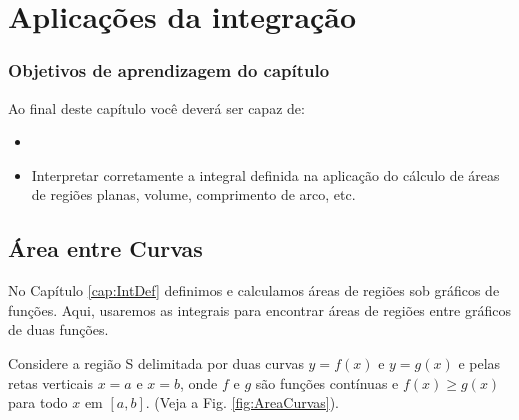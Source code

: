 \cleardoublepage\documentclass[../main.tex]{subfiles}
\begin{document}
\renewcommand\contentsname{Conteúdos do Capítulo}
\chapter{Aplicações da integração}\label{cap:apl_integracao}
\minitoc
\subsection*{Objetivos de aprendizagem do capítulo}
Ao final deste capítulo você deverá ser capaz de:
\begin{itemize}
    \item \item Interpretar corretamente a integral definida na aplicação do cálculo de áreas de regiões planas, volume, comprimento de arco, etc.
\end{itemize}
\section{Área entre Curvas}
%

\noindent No Capítulo \ref{cap:IntDef} definimos e calculamos áreas de regiões sob gráficos de funções. Aqui, usaremos as integrais para encontrar áreas de regiões entre gráficos de duas funções.

\noindent Considere a região S delimitada por duas curvas $y=  f ( x )$ e $y = g ( x )$ e pelas retas
verticais \(x =a\) e \(x=  b \), onde \(f\) e $g$ são funções contínuas e \(f ( x ) \geq g ( x ) \) para todo \(x\) em \([a, b]\). (Veja a Fig. \ref{fig:AreaCurvas}).
\end{document}
